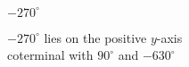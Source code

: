 {$-270^{\circ}$}
{$-270^{\circ}$  lies on the positive $y$-axis\\
coterminal with $90^{\circ}$ and $-630^{\circ}$ 

\begin{center}
\end{center}}